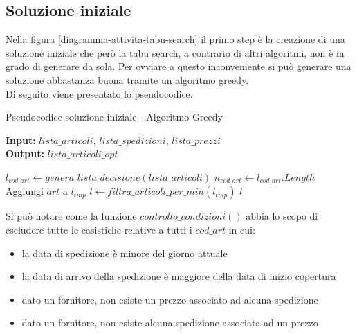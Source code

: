 \subsection{Soluzione iniziale}
\label{sec:soluzione-iniziale}
\noindent Nella figura \ref{diagramma-attivita-tabu-search} il primo step è la creazione di una soluzione iniziale che
però la tabu search, a contrario di altri algoritmi, non è in grado di generare da sola. Per ovviare a questo inconveniente
si può generare una soluzione abbastanza buona tramite un algoritmo greedy.\\
Di seguito viene presentato lo pseudocodice.
\vspace*{\fill}
\begin{algorithm}
    \captionsetup{labelformat=empty}
    \caption{Pseudocodice soluzione iniziale - Algoritmo Greedy}
    \vspace{0.1cm}
    \hspace*{\algorithmicindent} \textbf{Input:} {$lista\_articoli$}, {$lista\_spedizioni$}, {$lista\_prezzi$}\\
    \hspace*{\algorithmicindent} \textbf{Output:} {$lista\_articoli\_opt$}
    \begin{algorithmic}[1]
        \State $l_{cod\_art} \gets genera\_lista\_decisione(lista\_articoli)$
        \State $n_{cod\_art} \gets l_{cod\_art}.Length$
                    \State Aggiungi $art$ a $l_{tmp}$
                \EndIf
            \EndFor
        \EndWhile
        \State $l \gets filtra\_articoli\_per\_min(l_{tmp})$
        \State \Return $l$
        \EndProcedure
    \end{algorithmic}
\end{algorithm}
\vspace*{\fill}
\newpage
\noindent Si può notare come la funzione $controllo\_condizioni()$ abbia lo scopo di escludere tutte le casistiche relative a tutti i $cod\_art$ in cui:
\begin{itemize}
    \item la data di spedizione è minore del giorno attuale
    \item la data di arrivo della spedizione è maggiore della data di inizio copertura
    \item dato un fornitore, non esiste un prezzo associato ad alcuna spedizione
    \item dato un fornitore, non esiste alcuna spedizione associata ad un prezzo
\end{itemize}

